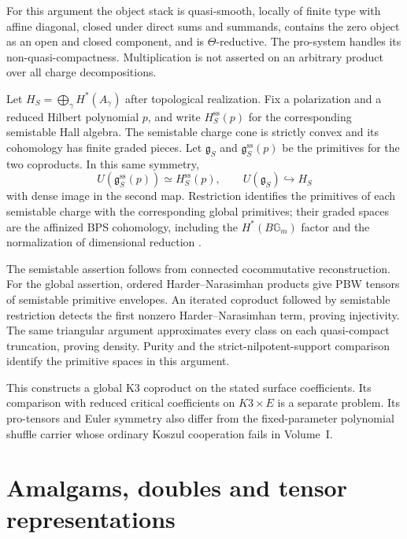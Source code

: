 For this argument the object stack is quasi-smooth, locally of finite
type with affine diagonal, closed under direct sums and summands,
contains the zero object as an open and closed component, and is
$\Theta$-reductive. The pro-system handles its non-quasi-compactness.
Multiplication is not asserted on an arbitrary product over all charge
decompositions.

Let $H_S=\bigoplus_\gamma H^*(A_\gamma)$ after topological realization.
Fix a polarization and a reduced Hilbert polynomial $p$, and write
$H_S^{\mathrm{ss}}(p)$ for the corresponding semistable Hall algebra. The semistable
charge cone is strictly convex and its cohomology has finite graded
pieces. Let $\mathfrak g_S$ and $\mathfrak g_S^{\mathrm{ss}}(p)$ be
the primitives for the two coproducts. In this same symmetry,
\[
 U(\mathfrak g_S^{\mathrm{ss}}(p))\simeq H_S^{\mathrm{ss}}(p),
 \qquad U(\mathfrak g_S)\hookrightarrow H_S
\]
with dense image in the second map. Restriction identifies the primitives
of each semistable charge with the corresponding global primitives;
their graded spaces are the affinized BPS cohomology, including the
$H^*(B\mathbb G_m)$ factor and the normalization of dimensional reduction
\cite[Theorem~6.8]{DHKSvSurface}.

The semistable assertion follows from connected cocommutative
reconstruction. For the global assertion, ordered Harder--Narasimhan
products give PBW tensors of semistable primitive envelopes. An iterated
coproduct followed by semistable restriction detects the first nonzero
Harder--Narasimhan term, proving injectivity. The same triangular
argument approximates every class on each quasi-compact truncation,
proving density. Purity and the strict-nilpotent-support comparison
identify the primitive spaces in this argument.

This constructs a global K3 coproduct on the stated surface coefficients.
Its comparison with reduced critical coefficients on $K3\times E$ is
a separate problem. Its pro-tensors and Euler symmetry also differ
from the fixed-parameter polynomial shuffle carrier whose ordinary
Koszul cooperation fails in Volume~I.

\chapter{Amalgams, doubles and tensor representations}

